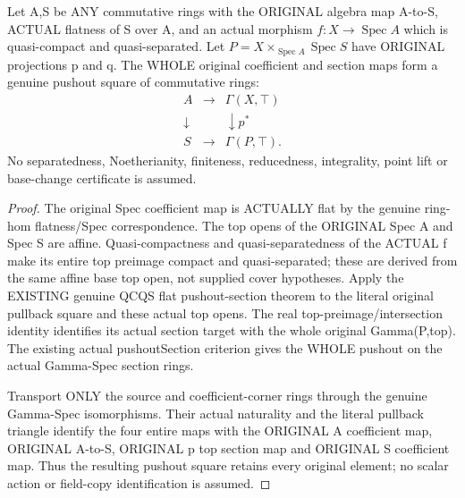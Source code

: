 \begin{theorem}
\label{scheme:actual-original-flat-global-section-pushout}
\leanok
{}
Let A,S be ANY commutative rings with the ORIGINAL algebra map A-to-S,
ACTUAL flatness of S over A, and an actual morphism
$f:X\to\operatorname{Spec}A$ which is quasi-compact and quasi-separated.
Let $P=X\times_{\operatorname{Spec}A}\operatorname{Spec}S$ have ORIGINAL
projections p and q. The WHOLE original coefficient and section maps form
a genuine pushout square of commutative rings:
\[
\begin{matrix}
 A&\longrightarrow&\Gamma(X,\top)\\
 \downarrow&&\downarrow p^*\\
 S&\longrightarrow&\Gamma(P,\top).
\end{matrix}
\]
No separatedness, Noetherianity, finiteness, reducedness, integrality,
point lift or base-change certificate is assumed.
\end{theorem}
\begin{proof}
The original Spec coefficient map is ACTUALLY flat by the genuine
ring-hom flatness/Spec correspondence. The top opens of the ORIGINAL
Spec A and Spec S are affine. Quasi-compactness and quasi-separatedness of
the ACTUAL f make its entire top preimage compact and quasi-separated;
these are derived from the same affine base top open, not supplied cover
hypotheses. Apply the EXISTING genuine QCQS flat pushout-section theorem
to the literal original pullback square and these actual top opens.
The real top-preimage/intersection identity identifies its actual section
target with the whole original Gamma(P,top). The existing actual
pushoutSection criterion gives the WHOLE pushout on the actual Gamma-Spec
section rings.

Transport ONLY the source and coefficient-corner rings through the genuine
Gamma-Spec isomorphisms. Their actual naturality and the literal pullback
triangle identify the four entire maps with the ORIGINAL A coefficient
map, ORIGINAL A-to-S, ORIGINAL p top section map and ORIGINAL S coefficient
map. Thus the resulting pushout square retains every original element;
no scalar action or field-copy identification is assumed.
\end{proof}

